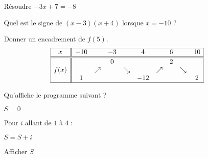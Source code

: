 \begin{MentalActivity}

\begin{mental}
            Résoudre \( -3x+7=-8\)
\end{mental}

\begin{mental}
            Quel est le signe de \( (x-3)(x+4)\) lorsque \( x=-10\) ?
\end{mental}

\begin{mental}
            Donner un encadrement de \( f(5)\).
    \begin{equation*}
        \begin{array}[]{|c||ccccccccc|}
            \hline
            x&-10&&-3&&4&&6&&10\\
            \hline\hline
            &&&0&&&&2&&\\
            f(x)&&\nearrow&&\searrow&&\nearrow&&\searrow&\\
            &1&&&&-12&&&&2\\
            \hline
        \end{array}
    \end{equation*}
\end{mental}

\begin{mental}
                Qu'affiche le programme suivant ?

\begin{fmpage}{0.9\linewidth}

    $S = 0$

    Pour \( i\) allant de \( 1\) à \( 4\) :

    \hspace{1cm} \( S=S+i\)

    Afficher \( S\)

\end{fmpage}

\end{mental}


\end{MentalActivity}
